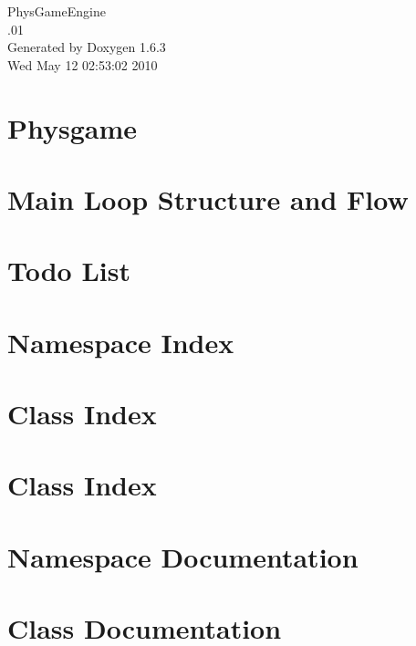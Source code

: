 \documentclass[a4paper]{book}
\begin{document}
\hypersetup{pageanchor=false}
\begin{titlepage}
\vspace*{7cm}
\begin{center}
{\Large PhysGameEngine \\[1ex]\large .01 }\\
\vspace*{1cm}
{\large Generated by Doxygen 1.6.3}\\
\vspace*{0.5cm}
{\small Wed May 12 02:53:02 2010}\\
\end{center}
\end{titlepage}
\clearemptydoublepage
{}
\tableofcontents
\clearemptydoublepage
{}
\hypersetup{pageanchor=true}
\chapter{Physgame}
\label{index}\hypertarget{index}{}
\chapter{Main Loop Structure and Flow}
\label{mainloop1}
\hypertarget{mainloop1}{}

\chapter{Todo List}
\label{todo}
\hypertarget{todo}{}

\chapter{Namespace Index}

\chapter{Class Index}

\chapter{Class Index}

\chapter{Namespace Documentation}

\chapter{Class Documentation}















\printindex
\end{document}
